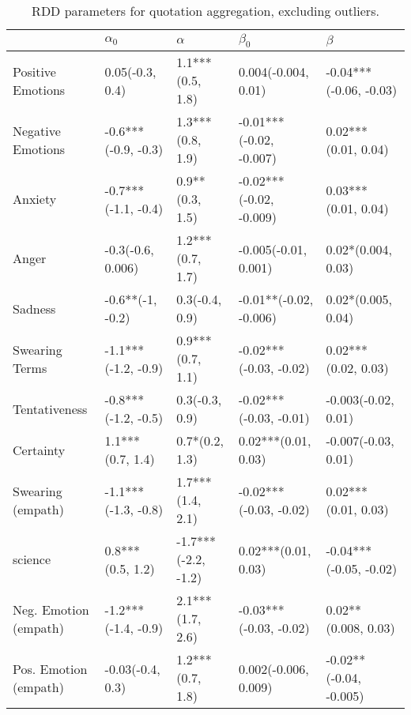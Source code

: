 \begin{table}[h]\centering
\caption{RDD parameters for quotation aggregation, excluding outliers.}
	\label{fig: Quotation_2}
\begin{adjustbox}{width=\linewidth, center}
	\begin{tabular}{lllll}
	\toprule
	{} &           $\alpha_0$ &             $\alpha$ &                $\beta_0$ &                 $\beta$ \\
	\midrule
	Positive Emotions     &      0.05(-0.3, 0.4) &     1.1***(0.5, 1.8) &      0.004(-0.004, 0.01) &  -0.04***(-0.06, -0.03) \\
	Negative Emotions     &  -0.6***(-0.9, -0.3) &     1.3***(0.8, 1.9) &  -0.01***(-0.02, -0.007) &     0.02***(0.01, 0.04) \\
	Anxiety               &  -0.7***(-1.1, -0.4) &      0.9**(0.3, 1.5) &  -0.02***(-0.02, -0.009) &     0.03***(0.01, 0.04) \\
	Anger                 &    -0.3(-0.6, 0.006) &     1.2***(0.7, 1.7) &     -0.005(-0.01, 0.001) &      0.02*(0.004, 0.03) \\
	Sadness               &     -0.6**(-1, -0.2) &       0.3(-0.4, 0.9) &   -0.01**(-0.02, -0.006) &      0.02*(0.005, 0.04) \\
	Swearing Terms        &  -1.1***(-1.2, -0.9) &     0.9***(0.7, 1.1) &   -0.02***(-0.03, -0.02) &     0.02***(0.02, 0.03) \\
	Tentativeness         &  -0.8***(-1.2, -0.5) &       0.3(-0.3, 0.9) &   -0.02***(-0.03, -0.01) &     -0.003(-0.02, 0.01) \\
	Certainty             &     1.1***(0.7, 1.4) &       0.7*(0.2, 1.3) &      0.02***(0.01, 0.03) &     -0.007(-0.03, 0.01) \\
	Swearing (empath)     &  -1.1***(-1.3, -0.8) &     1.7***(1.4, 2.1) &   -0.02***(-0.03, -0.02) &     0.02***(0.01, 0.03) \\
	science               &     0.8***(0.5, 1.2) &  -1.7***(-2.2, -1.2) &      0.02***(0.01, 0.03) &  -0.04***(-0.05, -0.02) \\
	Neg. Emotion (empath) &  -1.2***(-1.4, -0.9) &     2.1***(1.7, 2.6) &   -0.03***(-0.03, -0.02) &     0.02**(0.008, 0.03) \\
	Pos. Emotion (empath) &     -0.03(-0.4, 0.3) &     1.2***(0.7, 1.8) &     0.002(-0.006, 0.009) &  -0.02**(-0.04, -0.005) \\
	\bottomrule
	\end{tabular}
	
\end{adjustbox}
	\end{table}

